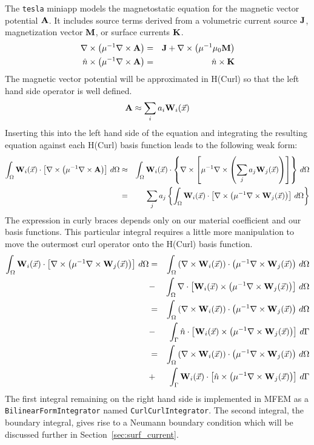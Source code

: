 \documentclass[12pt]{article}
\providecommand{\A}{\mbox{\bf A}}
\providecommand{\J}{\mbox{\bf J}}
\providecommand{\K}{\mbox{\bf K}}
\providecommand{\M}{\mbox{\bf M}}
\providecommand{\W}{\mbox{\bf W}}
\providecommand{\x}{\vec{x}}
\newcommand{\refSec}[1]{Section~\ref{sec:#1}}
\newcommand{\Div}{\nabla\cdot}
\newcommand{\Curl}{\nabla\times}
\begin{document}
The {\tt tesla} miniapp models the magnetostatic equation for the
magnetic vector potential $\A$. It includes source terms derived from
a volumetric current source $\J$, magnetization vector $\M$, or
surface currents $\K$.
\begin{eqnarray*}
  \Curl\left(\mu^{-1}\Curl\A\right) &=& \J +\Curl\left(\mu^{-1}\mu_0\M\right)\\
  \hat{n}\times\left(\mu^{-1}\Curl\A\right) &=& \hat{n}\times\K
\end{eqnarray*}
The magnetic vector potential will be approximated in H(Curl) so that
the left hand side operator is well defined.
\[\A\approx\sum_ia_i\W_i(\x)\]
Inserting this into the left hand side of the equation and integrating
the resulting equation against each H(Curl) basis function leads to
the following weak form:
\begin{eqnarray*}
  \int_\Omega\W_i(\x)\cdot\left[\Curl\left(\mu^{-1}\Curl\A\right)\right]\,d\Omega
  &\approx&
  \int_\Omega\W_i(\x)\cdot\left\{\Curl\left[\mu^{-1}\Curl\left(\sum_j a_j\W_j(\x)\right)\right]\right\}\,d\Omega\\
  &=&
    \sum_j a_j\left\{\int_\Omega\W_i(\x)\cdot\left[\Curl\left(\mu^{-1}\Curl\W_j(\x)\right)\right]\,d\Omega\right\}\\
\end{eqnarray*}
The expression in curly braces depends only on our material
coefficient and our basis functions. This particular integral requires
a little more manipulation to move the outermost curl operator onto
the H(Curl) basis function.
\begin{eqnarray*}
  \int_\Omega\W_i(\x)\cdot\left[\Curl\left(\mu^{-1}\Curl\W_j(\x)\right)\right]\,d\Omega
  &=&
  \int_\Omega\left(\Curl\W_i(\x)\right)\cdot\left(\mu^{-1}\Curl\W_j(\x)\right)\,d\Omega\\
  &-&  \int_\Omega\Div\left[\W_i(\x)\times\left(\mu^{-1}\Curl\W_j(\x)\right)\right]\,d\Omega \\
  &=&
  \int_\Omega\left(\Curl\W_i(\x)\right)\cdot\left(\mu^{-1}\Curl\W_j(\x)\right)\,d\Omega\\
  &-&  \int_\Gamma\hat{n}\cdot\left[\W_i(\x)\times\left(\mu^{-1}\Curl\W_j(\x)\right)\right]\,d\Gamma \\
  &=&
  \int_\Omega\left(\Curl\W_i(\x)\right)\cdot\left(\mu^{-1}\Curl\W_j(\x)\right)\,d\Omega\\
  &+&  \int_\Gamma\W_i(\x)\cdot\left[\hat{n}\times\left(\mu^{-1}\Curl\W_j(\x)\right)\right]\,d\Gamma \\
\end{eqnarray*}
The first integral remaining on the right hand side is implemented in
MFEM as a {\tt BilinearFormIntegrator} named {\tt CurlCurlIntegrator}. The second integral, the boundary integral, gives rise to a Neumann boundary condition which will be discussed further in \refSec{surf_current}. 
\end{document}
